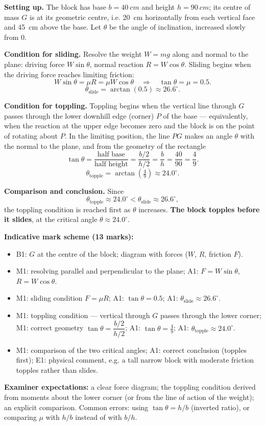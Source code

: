\documentclass[11pt]{article}
\begin{document}
\begin{corrige}
\textbf{Setting up.} The block has base $b = \SI{40}{cm}$ and height $h = \SI{90}{cm}$; its centre of mass $G$ is at its geometric centre, i.e. \SI{20}{cm} horizontally from each vertical face and \SI{45}{cm} above the base. Let $\theta$ be the angle of inclination, increased slowly from $0$.

\textbf{Condition for sliding.} Resolve the weight $W = mg$ along and normal to the plane: driving force $W\sin\theta$, normal reaction $R = W\cos\theta$. Sliding begins when the driving force reaches limiting friction:
\[
W\sin\theta = \mu R = \mu W\cos\theta \quad\Longrightarrow\quad \tan\theta = \mu = 0.5.
\]
\[
\theta_{\text{slide}} = \arctan(0.5) \approx 26.6^\circ.
\]

\textbf{Condition for toppling.} Toppling begins when the vertical line through $G$ passes through the lower downhill edge (corner) $P$ of the base — equivalently, when the reaction at the upper edge becomes zero and the block is on the point of rotating about $P$. In the limiting position, the line $PG$ makes an angle $\theta$ with the normal to the plane, and from the geometry of the rectangle
\[
\tan\theta = \frac{\text{half base}}{\text{half height}} = \frac{b/2}{h/2} = \frac{b}{h} = \frac{40}{90} = \frac{4}{9}.
\]
\[
\theta_{\text{topple}} = \arctan\!\left(\tfrac{4}{9}\right) \approx 24.0^\circ.
\]

\textbf{Comparison and conclusion.} Since
\[
\theta_{\text{topple}} \approx 24.0^\circ < \theta_{\text{slide}} \approx 26.6^\circ,
\]
the toppling condition is reached first as $\theta$ increases. \textbf{The block topples before it slides}, at the critical angle $\theta \approx 24.0^\circ$.

\textbf{Indicative mark scheme (13 marks):}
\begin{itemize}
\item B1: $G$ at the centre of the block; diagram with forces ($W$, $R$, friction $F$).
\item M1: resolving parallel and perpendicular to the plane; A1: $F = W\sin\theta$, $R = W\cos\theta$.
\item M1: sliding condition $F = \mu R$; A1: $\tan\theta = 0.5$; A1: $\theta_{\text{slide}} \approx 26.6^\circ$.
\item M1: toppling condition — vertical through $G$ passes through the lower corner; M1: correct geometry $\tan\theta = \dfrac{b/2}{h/2}$; A1: $\tan\theta = \tfrac{4}{9}$; A1: $\theta_{\text{topple}} \approx 24.0^\circ$.
\item M1: comparison of the two critical angles; A1: correct conclusion (topples first); E1: physical comment, e.g. a tall narrow block with moderate friction topples rather than slides.
\end{itemize}
\textbf{Examiner expectations:} a clear force diagram; the toppling condition derived from moments about the lower corner (or from the line of action of the weight); an explicit comparison. Common errors: using $\tan\theta = h/b$ (inverted ratio), or comparing $\mu$ with $h/b$ instead of with $b/h$.
\end{corrige}
\end{document}
